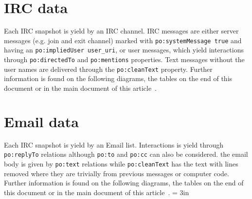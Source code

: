 \documentclass[review]{elsarticle}
\newcommand{\textttt}[1] {\texttt{\footnotesize#1}}
\begin{document}
\section{IRC data}
Each IRC snapshot is yield by an IRC channel.
IRC messages are either server messages (e.g. join and exit channel)
marked with \textttt{po:systemMessage true} and having an \textttt{po:impliedUser user\_uri},
or user messages, which yield interactions through \textttt{po:directedTo} and \textttt{po:mentions} properties.
Text messages without the user names are delivered through the \textttt{po:cleanText} property.
Further information is found on the following diagrams, the tables on
the end of this document or in the main document of this
article~\cite{losd}.

\section{Email data}
Each IRC snapshot is yield by an Email list.
Interactions is yield through \textttt{po:replyTo} relations
although \textttt{po:to} and \textttt{po:cc} can also be considered.
the email body is given by \textttt{po:text} relations while
\textttt{po:cleanText} has the text with lines removed where they are
trivially from previous messages or computer code.
Further information is found on the following diagrams, the tables on
the end of this document or in the main document of this
article~\cite{losd}.
\textheight = 3in
\pdfpageheight 6in
\end{document}
